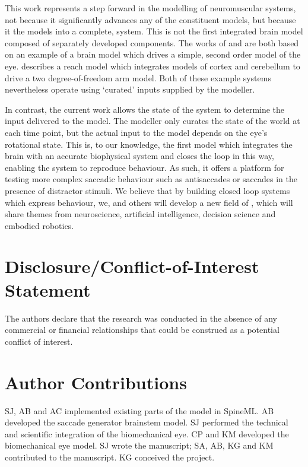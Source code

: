 \documentclass{frontiersSCNS}
\begin{document}
This work represents a step forward in the modelling of neuromuscular
systems, not because it significantly advances any of the constituent
models, but because it  the models into a
complete,  system.  This is not the first integrated brain
model composed of separately developed components. The works
of \cite{nguyen_saccade_2014} and
\cite{thurat_biomimetic_2015} are both based
on an example of a brain model which drives a simple, second order
model of the eye. \cite{dewolf_spiking_2016} describes a reach model
which integrates models of cortex and cerebellum to drive a two
degree-of-freedom arm model. Both of these example systems
nevertheless operate using `curated' inputs supplied by the modeller.

In contrast, the current work allows the state of the system to
determine the input delivered to the model. The modeller only curates
the state of the world at each time point, but the actual input to the
model depends on the eye's rotational state.  This is, to our
knowledge, the first model which integrates the brain with an accurate
biophysical system and closes the loop in this way, enabling the
system to reproduce behaviour.  As such, it offers a platform for
testing more complex saccadic behaviour such as antisaccades or
saccades in the presence of distractor stimuli. We believe that by
building closed loop systems which express behaviour, we, and others
will develop a new field of , which
will share themes from neuroscience, artificial intelligence, decision
science and embodied robotics.


\section*{Disclosure/Conflict-of-Interest Statement}

The authors declare that the research was conducted in the absence of
any commercial or financial relationships that could be construed as a
potential conflict of interest.


\section*{Author Contributions}

SJ, AB and AC implemented existing parts of the model in SpineML. AB
developed the saccade generator brainstem model. SJ performed the
technical and scientific integration of the biomechanical eye.  CP and
KM developed the biomechanical eye model. SJ wrote the manuscript; SA,
AB, KG and KM contributed to the manuscript. KG conceived the project.
\end{document}
